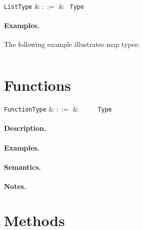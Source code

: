 \begin{syntax}
  \verb+ListType+ & $::=$ & \token{[} \ \verb+Type+ \ \token{]}\\
\end{syntax}

\paragraph{Examples.}  The following example illustrates map types:

\begin{lstlisting}
\end{lstlisting}


\section{Functions}

\begin{syntax}
  \verb+FunctionType+ & $::=$ & \ \token{(}\
  \ \token{)}\ \token{=>}\ \verb+Type+\\
\end{syntax}

\paragraph{Description.}  

\paragraph{Examples.}

\paragraph{Semantics.}

\paragraph{Notes.}


\section{Methods}

